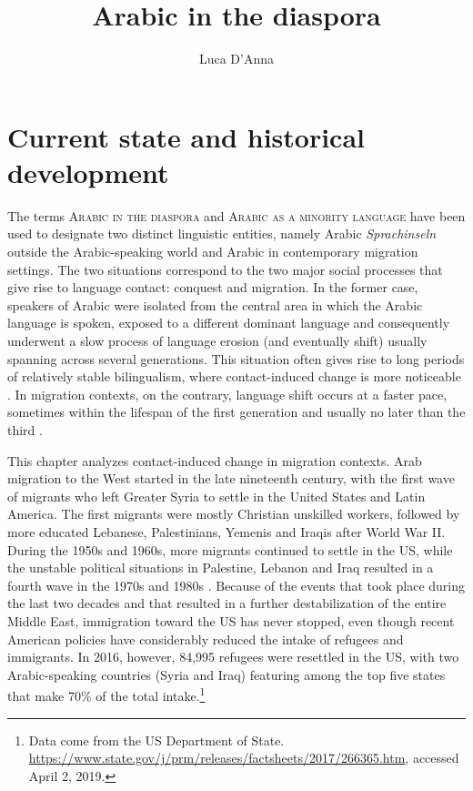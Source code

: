 \documentclass[output=paper]{langsci/langscibook}
\author{Luca D'Anna\affiliation{Università degli Studi di Napoli `L'Orientale'}}
\title{Arabic in the diaspora}
\begin{document}
\maketitle 

\section{Current state and historical development}

The terms \textsc{Arabic in the diaspora} and \textsc{Arabic as a minority language} have been used to designate two distinct linguistic entities, namely Arabic \textit{Sprachinseln} outside the Arabic-speaking world and Arabic in contemporary migration settings. The two situations correspond to the two major social processes that give rise to language contact: conquest and migration. In the former case, speakers of Arabic were isolated from the central area in which the Arabic language is spoken, exposed to a different dominant language and consequently underwent a slow process of language erosion (and eventually shift) usually spanning across several generations. This situation often gives rise to long periods of relatively stable bilingualism, where contact-induced change is more noticeable \citep[641]{Sankoff2001}. In migration contexts, on the contrary, language shift occurs at a faster pace, sometimes within the lifespan of the first generation and usually no later than the third \citep[151]{Canagarajah2008}. 

This chapter analyzes contact-induced change in migration contexts. Arab migration to the West started in the late nineteenth century, with the first wave of migrants who left Greater Syria to settle in the United States and Latin America. The first migrants were mostly Christian unskilled workers, followed by more educated Lebanese, Palestinians, Yemenis and Iraqis after World War II. During the 1950s and 1960s, more migrants continued to settle in the US, while the unstable political situations in Palestine, Lebanon and Iraq resulted in a fourth wave in the 1970s and 1980s \citep[17--18]{Rouchdy_introduction_1992}. Because of the events that took place during the last two decades and that resulted in a further destabilization of the entire Middle East, immigration toward the US has never stopped, even though recent American policies have considerably reduced the intake of refugees and immigrants. In 2016, however, 84,995 refugees were resettled in the US, with two Arabic-speaking countries (Syria and Iraq) featuring among the top five states that make 70\% of the total intake.\footnote{Data come from the US Department of State. \url{https://www.state.gov/j/prm/releases/factsheets/2017/266365.htm}, accessed April 2, 2019.}
\end{document}

